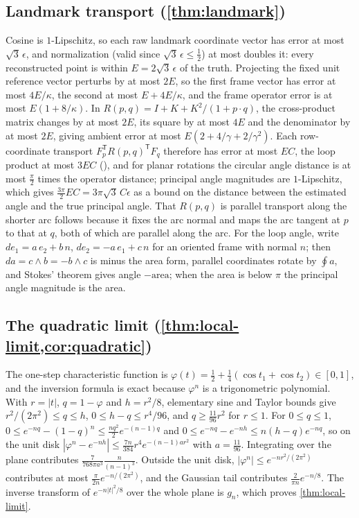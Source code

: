 \subsection{Landmark transport (\texorpdfstring{\cref{thm:landmark}}{Theorem 7.3})}
\label{app:landmark-proof}

Cosine is $1$-Lipschitz, so each raw landmark coordinate vector has error at most $\sqrt3\,\epsilon$, and normalization (valid since $\sqrt3\,\epsilon\le\tfrac12$) at most doubles it: every reconstructed point is within $E=2\sqrt3\,\epsilon$ of the truth.
Projecting the fixed unit reference vector perturbs by at most $2E$, so the first frame vector has error at most $4E/\kappa$, the second at most $E+4E/\kappa$, and the frame operator error is at most $E(1+8/\kappa)$.
In $R(p,q)=I+K+K^2/(1+p\cdot q)$, the cross-product matrix changes by at most $2E$, its square by at most $4E$ and the denominator by at most $2E$, giving ambient error at most $E(2+4/\gamma+2/\gamma^2)$.
Each row-coordinate transport $F_p^{\mathsf T}R(p,q)^{\mathsf T}F_q$ therefore has error at most $EC$, the loop product at most $3EC$ (), and for planar rotations the circular angle distance is at most $\tfrac\pi2$ times the operator distance; principal angle magnitudes are $1$-Lipschitz, which gives $\tfrac{3\pi}2EC=3\pi\sqrt3\,C\epsilon$ as a bound on the distance between the estimated angle and the true principal angle.
That $R(p,q)$ is parallel transport along the shorter arc follows because it fixes the arc normal and maps the arc tangent at $p$ to that at $q$, both of which are parallel along the arc.
For the loop angle, write $de_1=a\,e_2+b\,n$, $de_2=-a\,e_1+c\,n$ for an oriented frame with normal $n$; then $da=c\wedge b=-b\wedge c$ is minus the area form, parallel coordinates rotate by $\oint a$, and Stokes' theorem gives angle $-\text{area}$; when the area is below $\pi$ the principal angle magnitude is the area.

\subsection{The quadratic limit (\texorpdfstring{\cref{thm:local-limit,cor:quadratic}}{Theorem 8.1 and Corollary 8.2})}
\label{app:quadratic-proof}

The one-step characteristic function is $\varphi(t)=\tfrac12+\tfrac14(\cos t_1+\cos t_2)\in[0,1]$, and the inversion formula is exact because $\varphi^n$ is a trigonometric polynomial.
With $r=|t|$, $q=1-\varphi$ and $h=r^2/8$, elementary sine and Taylor bounds give $r^2/(2\pi^2)\le q\le h$, $0\le h-q\le r^4/96$, and $q\ge\tfrac{11}{96}r^2$ for $r\le1$.
For $0\le q\le1$, $0\le e^{-nq}-(1-q)^n\le\tfrac{n q^2}2e^{-(n-1)q}$ and $0\le e^{-nq}-e^{-nh}\le n(h-q)e^{-nq}$, so on the unit disk $|\varphi^n-e^{-nh}|\le\tfrac{7n}{384}r^4e^{-(n-1)ar^2}$ with $a=\tfrac{11}{96}$.
Integrating over the plane contributes $\tfrac{7}{768\pi a^3}\tfrac{n}{(n-1)^3}$.
Outside the unit disk, $|\varphi^n|\le e^{-nr^2/(2\pi^2)}$ contributes at most $\tfrac{\pi}{2n}e^{-n/(2\pi^2)}$, and the Gaussian tail contributes $\tfrac2{\pi n}e^{-n/8}$.
The inverse transform of $e^{-n|t|^2/8}$ over the whole plane is $g_n$, which proves \cref{thm:local-limit}.

